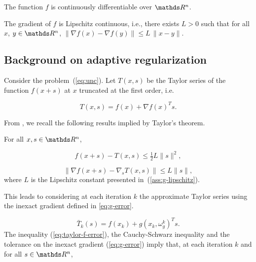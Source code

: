 \documentclass[runningheads,orivec,oribibl]{llncs}
\begin{document}
\begin{assumption}
  \label{ass:f-C1}
  The function \(f\) is continuously differentiable over \(\R^n\).
\end{assumption}

\begin{assumption}
  \label{ass:g-lipschitz}
  The gradient of \(f\) is Lipschitz continuous, i.e., there exists \(L > 0\) such that for all \(x\), \(y \in \R^n\), \(\|\nabla f(x) - \nabla f(y)\| \leq L \, \|x - y\|\).
\end{assumption}


\subsection{Background on adaptive regularization}

Consider the problem~(\ref{eq:unc}).
Let \(T(x,s)\) be the Taylor series of the function \(f(x+s)\) at \(x\) truncated at the first order, i.e.

\begin{equation*}
  T(x,s) = f(x) + \nabla f(x)^{T}s.
\end{equation*}

 From \cite{birgin-gardenghi-martinez-santos-toint-2017}, we recall the following results implied by Taylor's theorem.

 For all \(x,s \in \R^n\),

\begin{equation}
  \label{eq:taylor-f-error}
  f(x+s)-T(x,s) \leq \tfrac{1}{2}L\|s\|^2,
\end{equation}

\begin{equation}
  \label{eq:taylor-g-error}
  \|\nabla f(x+s) - \nabla_s T(x,s)\| \leq L\|s\|,
\end{equation}
where \(L\) is the Lipschitz constant presented in~(\autoref{ass:g-lipschitz}).

This leads to considering at each iteration \(k\) the approximate Taylor series using the inexact gradient defined in \ref{eq:g-error}.

\begin{equation*}
  \bar{T}_k (s) = f(x_k) + g(x_k,\omega_g^k)^T s.
\end{equation*}
The inequality (\ref{eq:taylor-f-error}), the Cauchy-Schwarz inequality and the tolerance on the inexact gradient (\ref{eq:g-error}) imply that, at each iteration \(k\) and for all \(s \in \R^n\),
\end{document}

